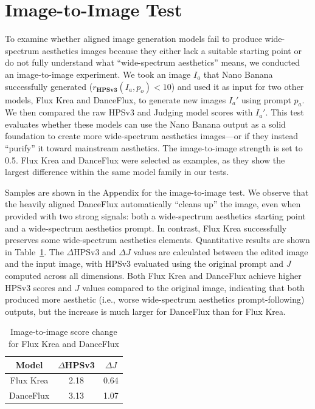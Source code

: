 \section{Image-to-Image Test}
To examine whether aligned image generation models fail to produce wide-spectrum aesthetics images because they either lack a suitable starting point or do not fully understand what ``wide-spectrum aesthetics'' means, we conducted an image-to-image experiment. We took an image $I_a$ that Nano Banana successfully generated ($r_{\textbf{HPSv3}}(I_a, p_o) < 10$) and used it as input for two other models, Flux Krea and DanceFlux, to generate new images $I_a'$ using prompt $p_a$. We then compared the raw HPSv3 and Judging model scores with $I_a'$. This test evaluates whether these models can use the Nano Banana output as a solid foundation to create more wide-spectrum aesthetics images—or if they instead ``purify'' it toward mainstream aesthetics. The image-to-image strength is set to 0.5. Flux Krea and DanceFlux were selected as examples, as they show the largest difference within the same model family in our tests.

Samples are shown in the Appendix for the image-to-image test. We observe that the heavily aligned DanceFlux automatically ``cleans up'' the image, even when provided with two strong signals: both a wide-spectrum aesthetics starting point and a wide-spectrum aesthetics prompt. In contrast, Flux Krea successfully preserves some wide-spectrum aesthetics elements. Quantitative results are shown in Table~\ref{tab:img2img}. The $\Delta$HPSv3 and $\Delta J$ values are calculated between the edited image and the input image, with HPSv3 evaluated using the original prompt and $J$ computed across all dimensions. Both Flux Krea and DanceFlux achieve higher HPSv3 scores and $J$ values compared to the original image, indicating that both produced more aesthetic (i.e., worse wide-spectrum aesthetics prompt-following) outputs, but the increase is much larger for DanceFlux than for Flux Krea.

\begin{table}
 \centering
 \small
 \caption{Image-to-image score change for Flux Krea and DanceFlux}

 \begin{tabular}{ccc}
 \toprule
 Model & $\Delta$HPSv3 & $\Delta J$ \\
 \midrule
 Flux Krea & 2.18 & 0.64 \\
 DanceFlux & 3.13 & 1.07 \\
 \bottomrule
 \end{tabular}
 \label{tab:img2img}
 \raggedbottom
 \vspace{-18pt}
\end{table}

